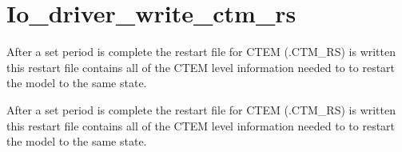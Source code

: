 \hypertarget{group__io__driver__write__ctm__rs}{}\section{Io\+\_\+driver\+\_\+write\+\_\+ctm\+\_\+rs}
\label{group__io__driver__write__ctm__rs}


After a set period is complete the restart file for C\+T\+E\+M (.C\+T\+M\+\_\+\+R\+S) is written this restart file contains all of the C\+T\+E\+M level information needed to to restart the model to the same state.  


After a set period is complete the restart file for C\+T\+E\+M (.C\+T\+M\+\_\+\+R\+S) is written this restart file contains all of the C\+T\+E\+M level information needed to to restart the model to the same state. 

